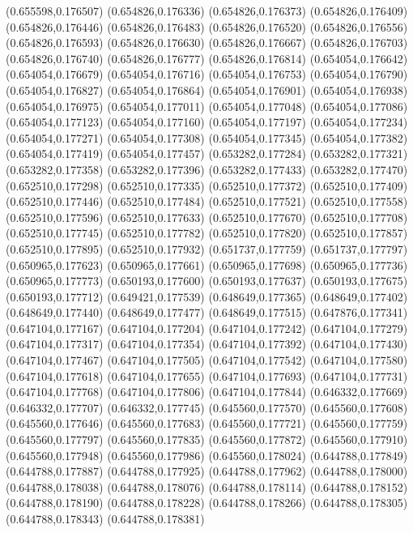 (0.655598,0.176507)
(0.654826,0.176336)
(0.654826,0.176373)
(0.654826,0.176409)
(0.654826,0.176446)
(0.654826,0.176483)
(0.654826,0.176520)
(0.654826,0.176556)
(0.654826,0.176593)
(0.654826,0.176630)
(0.654826,0.176667)
(0.654826,0.176703)
(0.654826,0.176740)
(0.654826,0.176777)
(0.654826,0.176814)
(0.654054,0.176642)
(0.654054,0.176679)
(0.654054,0.176716)
(0.654054,0.176753)
(0.654054,0.176790)
(0.654054,0.176827)
(0.654054,0.176864)
(0.654054,0.176901)
(0.654054,0.176938)
(0.654054,0.176975)
(0.654054,0.177011)
(0.654054,0.177048)
(0.654054,0.177086)
(0.654054,0.177123)
(0.654054,0.177160)
(0.654054,0.177197)
(0.654054,0.177234)
(0.654054,0.177271)
(0.654054,0.177308)
(0.654054,0.177345)
(0.654054,0.177382)
(0.654054,0.177419)
(0.654054,0.177457)
(0.653282,0.177284)
(0.653282,0.177321)
(0.653282,0.177358)
(0.653282,0.177396)
(0.653282,0.177433)
(0.653282,0.177470)
(0.652510,0.177298)
(0.652510,0.177335)
(0.652510,0.177372)
(0.652510,0.177409)
(0.652510,0.177446)
(0.652510,0.177484)
(0.652510,0.177521)
(0.652510,0.177558)
(0.652510,0.177596)
(0.652510,0.177633)
(0.652510,0.177670)
(0.652510,0.177708)
(0.652510,0.177745)
(0.652510,0.177782)
(0.652510,0.177820)
(0.652510,0.177857)
(0.652510,0.177895)
(0.652510,0.177932)
(0.651737,0.177759)
(0.651737,0.177797)
(0.650965,0.177623)
(0.650965,0.177661)
(0.650965,0.177698)
(0.650965,0.177736)
(0.650965,0.177773)
(0.650193,0.177600)
(0.650193,0.177637)
(0.650193,0.177675)
(0.650193,0.177712)
(0.649421,0.177539)
(0.648649,0.177365)
(0.648649,0.177402)
(0.648649,0.177440)
(0.648649,0.177477)
(0.648649,0.177515)
(0.647876,0.177341)
(0.647104,0.177167)
(0.647104,0.177204)
(0.647104,0.177242)
(0.647104,0.177279)
(0.647104,0.177317)
(0.647104,0.177354)
(0.647104,0.177392)
(0.647104,0.177430)
(0.647104,0.177467)
(0.647104,0.177505)
(0.647104,0.177542)
(0.647104,0.177580)
(0.647104,0.177618)
(0.647104,0.177655)
(0.647104,0.177693)
(0.647104,0.177731)
(0.647104,0.177768)
(0.647104,0.177806)
(0.647104,0.177844)
(0.646332,0.177669)
(0.646332,0.177707)
(0.646332,0.177745)
(0.645560,0.177570)
(0.645560,0.177608)
(0.645560,0.177646)
(0.645560,0.177683)
(0.645560,0.177721)
(0.645560,0.177759)
(0.645560,0.177797)
(0.645560,0.177835)
(0.645560,0.177872)
(0.645560,0.177910)
(0.645560,0.177948)
(0.645560,0.177986)
(0.645560,0.178024)
(0.644788,0.177849)
(0.644788,0.177887)
(0.644788,0.177925)
(0.644788,0.177962)
(0.644788,0.178000)
(0.644788,0.178038)
(0.644788,0.178076)
(0.644788,0.178114)
(0.644788,0.178152)
(0.644788,0.178190)
(0.644788,0.178228)
(0.644788,0.178266)
(0.644788,0.178305)
(0.644788,0.178343)
(0.644788,0.178381)
